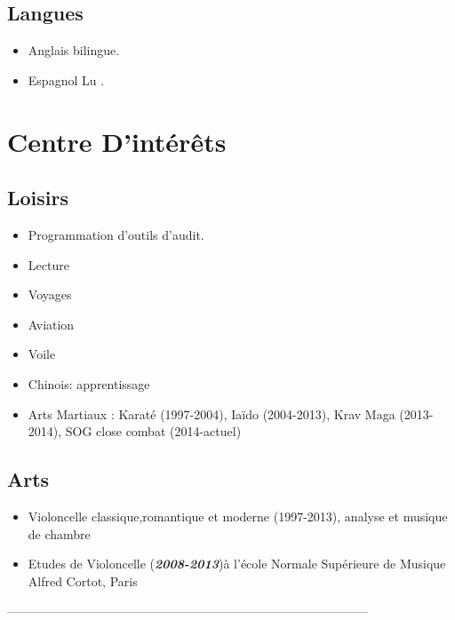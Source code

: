 \documentclass[a4paper, oneside, final]{scrartcl} %
\begin{document}
\begin{center}
\subsection*{Langues}
\begin{itemize}
	\item Anglais bilingue.
	\item Espagnol Lu .
\end{itemize}
\section*{Centre D'intérêts}
\subsection*{Loisirs}
\begin{itemize}
\item Programmation d'outils d'audit.
\item Lecture
\item Voyages
\item Aviation
\item Voile
\item Chinois: apprentissage
\item Arts Martiaux : Karaté (1997-2004), Iaïdo (2004-2013), Krav Maga (2013-2014), SOG
close combat (2014-actuel)
\end{itemize}
\subsection*{Arts}
\begin{itemize}
\item Violoncelle classique,romantique et moderne (1997-2013), analyse et musique de chambre
\item  Etudes de Violoncelle (\textbf{\textit{2008-2013}})à l'école Normale Supérieure de Musique Alfred Cortot, Paris\\
\end{itemize}

---------------------------------------------------------------------------------------

\end{center}
\end{document}
